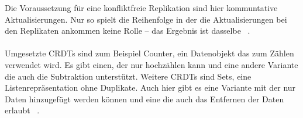 Die Voraussetzung für eine konfliktfreie Replikation sind hier kommuntative Aktualisierungen.
Nur so spielt die Reihenfolge in der die Aktualisierungen bei den Replikaten ankommen keine Rolle -- das Ergebnis ist dasselbe ~\cite{crdt_shapiro2}.\\\\
Umgesetzte \glspl{CRDT} sind zum Beispiel Counter, ein Datenobjekt das zum Zählen verwendet wird. Es gibt einen, der nur hochzählen kann und eine andere Variante die auch die Subtraktion unterstützt.
Weitere \glspl{CRDT} sind Sets, eine Listenrepräsentation ohne Duplikate. Auch hier gibt es eine Variante mit der nur Daten hinzugefügt werden können und eine die auch das Entfernen der Daten erlaubt ~\cite{crdt_shapiro}.
%
%
